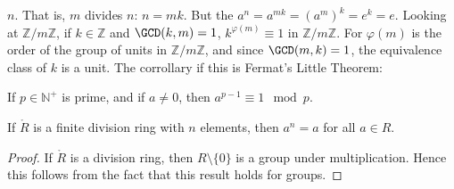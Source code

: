 \documentclass{book}                                                           %
\begin{document}
            $n$. That is, $m$ divides $n$: $n=mk$. But the
            $a^{n}=a^{mk}=(a^{m})^{k}=e^{k}=e$. Looking at
            $\mathbb{Z}/m\mathbb{Z}$, if $k\in\mathbb{Z}$ and
            $\GCD(k,m)=1$, $k^{\varphi(m)}\equiv{1}$ in
            $\mathbb{Z}/m\mathbb{Z}$. For $\varphi(m)$ is the order of the
            group of units in $\mathbb{Z}/m\mathbb{Z}$, and since
            $\GCD(m,k)=1$, the equivalence class of $k$ is a unit. The
            corrollary if this is Fermat's Little Theorem:
            \begin{theorem}
                If $p\in\mathbb{N}^{+}$ is prime, and if $a\ne{0}$, then
                $a^{p-1}\equiv{1}\mod{p}$.
            \end{theorem}
            \begin{theorem}
                If $\ring{R}$ is a finite division ring with $n$ elements,
                then $a^{n}=a$ for all $a\in{R}$.
            \end{theorem}
            \begin{proof}
                If $\ring{R}$ is a division ring, then $R\setminus\{0\}$ is
                a group under multiplication. Hence this follows from the
                fact that this result holds for groups.
            \end{proof}
\end{document}
